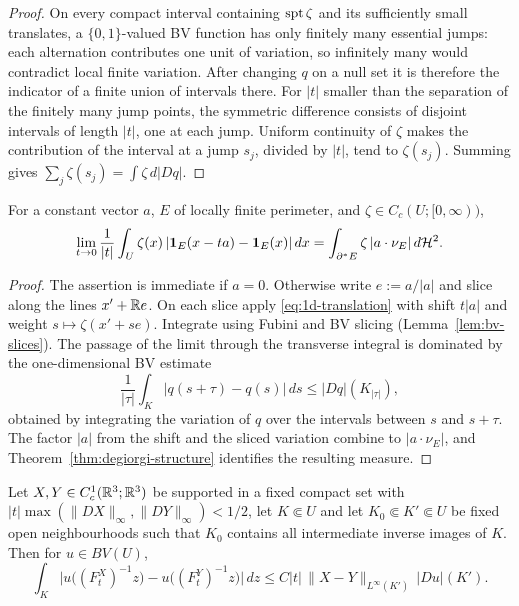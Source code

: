 \begin{proof}
On every compact interval containing $\operatorname{spt}\zeta$ and its sufficiently small
translates, a $\{0,1\}$-valued BV function has only finitely many essential
jumps: each alternation contributes one unit of variation, so infinitely
many would contradict local finite variation.  After changing $q$ on a null
set it is therefore the indicator of a finite union of intervals there.
For $|t|$ smaller than the separation of the finitely many jump points, the
symmetric difference consists of disjoint intervals of length $|t|$, one at
each jump.  Uniform continuity of $\zeta$ makes the contribution of the
interval at a jump $s_j$, divided by $|t|$, tend to $\zeta(s_j)$.  Summing
gives $\sum_j\zeta(s_j)=\int\zeta\,d|Dq|$.
\end{proof}

\begin{lemma}\label{lem:sym-diff-constant}
For a constant vector $a$, $E$ of locally finite perimeter, and
$\zeta\in C_c(U;[0,\infty))$,
\begin{equation}\label{eq:sym-diff-constant}
  \lim_{t\to0}\frac1{|t|}\int_U\zeta(x)\,|\mathbf 1_{E}(x-ta)-\mathbf 1_{E}(x)|\,dx
  =\int_{\partial^* E}\zeta\,|a\cdot\nu_E|\,d\mathcal H^2 .
\end{equation}
\end{lemma}

\begin{proof}
The assertion is immediate if $a=0$.  Otherwise write $e:=a/|a|$ and slice
along the lines $x'+\mathbb R e$.  On each slice apply
\eqref{eq:1d-translation} with shift $t|a|$ and weight
$s\mapsto\zeta(x'+se)$.  Integrate using Fubini and BV slicing
(Lemma~\ref{lem:bv-slices}).  The passage of the limit through the transverse
integral is dominated by the one-dimensional BV estimate
\[
 \frac1{|\tau|}\int_K|q(s+\tau)-q(s)|\,ds
 \le |Dq|(K_{|\tau|}),
\]
obtained by integrating the variation of $q$ over the intervals between
$s$ and $s+\tau$.  The factor $|a|$ from the shift and the sliced variation
combine to $|a\cdot\nu_E|$, and
Theorem~\ref{thm:degiorgi-structure} identifies the resulting measure.
\end{proof}

\begin{lemma}\label{lem:sym-diff-stability}
Let $X,Y\in C^1_c(\mathbb R^3;\mathbb R^3)$ be supported in a fixed compact set with
$|t|\max(\|DX\|_\infty,\|DY\|_\infty)<1/2$, let $K\Subset U$ and let
$K_0\Subset K'\Subset U$ be fixed open neighbourhoods such that $K_0$
contains all intermediate inverse images of $K$.  Then for $u\in BV(U)$,
\begin{equation}\label{eq:sym-diff-stability}
  \int_K\bigl|u\bigl((F^X_t)^{-1}z\bigr)-u\bigl((F^Y_t)^{-1}z\bigr)\bigr|\,dz
  \le C|t|\,\|X-Y\|_{L^\infty(K')}\,|Du|(K').
\end{equation}
\end{lemma}

